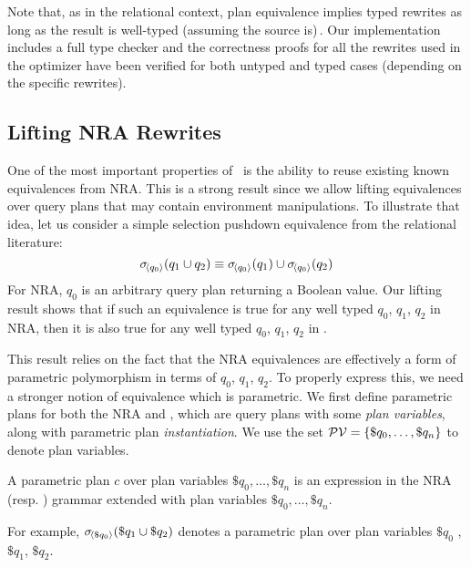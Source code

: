 Note that, as in the relational context, plan equivalence implies
typed rewrites as long as the result is well-typed (assuming the
source
is)\,.
Our implementation includes a full type checker and the correctness
proofs for all the rewrites used in the optimizer have been verified
for both untyped and typed cases (depending on the specific rewrites).

\subsection{Lifting NRA Rewrites}
\label{sec:nraenv:lifting}

One of the most important properties of \NRAEnv\ is the ability to
reuse existing known equivalences from NRA. This is a strong result
since we allow lifting equivalences over query plans that may contain
environment manipulations. To illustrate that idea, let us consider a
simple selection pushdown equivalence from the relational literature:
\[ \sigma\!_{\left\langle{q_0}\right\rangle}\!\left({q_1\cup q_2}\right) \equiv \sigma\!_{\left\langle{q_0}\right\rangle}\!\left({q_1}\right)\cup\sigma\!_{\left\langle{q_0}\right\rangle}\!\left({q_2}\right)\]
For NRA, $q_0$ is an arbitrary query plan returning a Boolean
value. Our lifting result shows that if such an equivalence is true
for any well typed $q_0$, $q_1$, $q_2$ in NRA, then it is also true
for any well typed $q_0$, $q_1$, $q_2$ in \NRAEnv.

This result relies on the fact that the NRA equivalences are
effectively a form of parametric polymorphism in terms of $q_0$,
$q_1$, $q_2$. To properly express this, we need a stronger notion of
equivalence which is parametric. We first define parametric plans for
both the NRA and \NRAEnv, which are query plans with some \emph{plan
  variables}, along with parametric plan \textit{instantiation}. We
use the set ${\cal PV} = \{ \$q_0,\ldots,\$q_n \}$ to denote plan
variables.

\begin{definition}
  A parametric plan $c$ over plan variables
  $\$q_0,\ldots,\$q_n$ is an expression in the NRA
  (resp. \NRAEnv) grammar extended with plan variables
  $\$q_0,\ldots,\$q_n$.
\end{definition}

For example, $\sigma\!_{\left\langle{\$q_0}\right\rangle}\!\left({\$q_1\cup\$q_2}\right)$ denotes a parametric
plan over plan variables $\$q_0$ , $\$q_1$, $\$q_2$.

